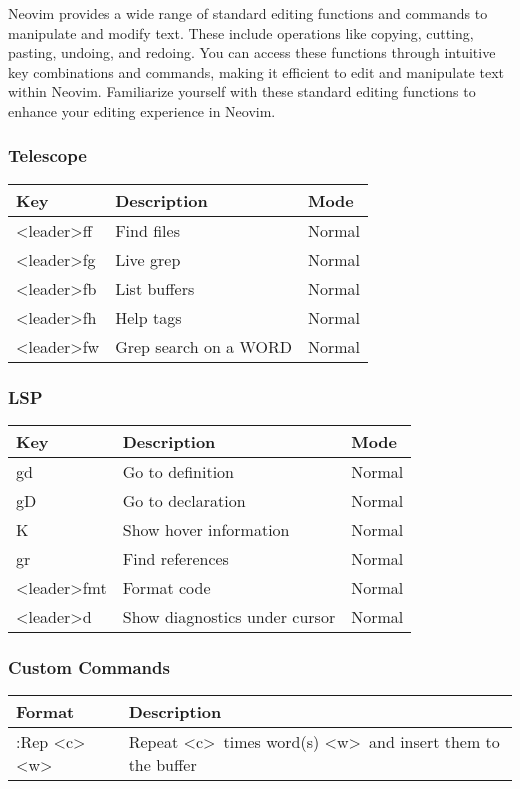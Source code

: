 \documentclass{article}
\newcommand{\tl}{\textless}
\newcommand{\tg}{\textgreater}
\begin{document}
Neovim provides a wide range of standard editing functions and commands 
to manipulate and modify text. These include operations like copying, cutting, 
pasting, undoing, and redoing. You can access these functions through intuitive 
key combinations and commands, making it efficient to edit and manipulate text 
within Neovim. Familiarize yourself with these standard editing functions to 
enhance your editing experience in Neovim.

\subsubsection{Telescope}

\begin{tabular}{|l|l|l|}
\hline
Key & Description & Mode \\
\hline
\tl leader\tg ff & Find files & Normal \\
\tl leader\tg fg & Live grep & Normal \\
\tl leader\tg fb & List buffers & Normal \\
\tl leader\tg fh & Help tags & Normal \\
\tl leader\tg fw & Grep search on a WORD & Normal \\
\hline
\end{tabular}

\subsubsection{LSP}

\begin{tabular}{|l|l|l|}
\hline
Key & Description & Mode \\
\hline
gd & Go to definition & Normal \\
gD & Go to declaration & Normal \\
K & Show hover information & Normal \\
gr & Find references & Normal \\
\tl leader\tg fmt & Format code & Normal \\
\tl leader\tg d & Show diagnostics under cursor & Normal \\
\hline
\end{tabular}

\subsubsection{Custom Commands}

\begin{tabular}{|l|l|}
\hline
Format & Description \\
\hline
:Rep \tl c\tg \tl w\tg & Repeat \tl c\tg\ times word(s) \tl w\tg\ and insert them to the buffer \\
\hline
\end{tabular}
\end{document}
